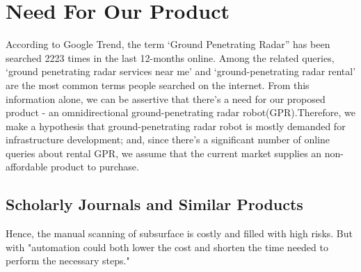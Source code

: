 \section{Need For Our Product}
According to Google Trend, the term ‘Ground Penetrating Radar” has been searched 2223 times in the last 12-months online. Among the related queries, ‘ground penetrating radar services near me’ and ‘ground-penetrating radar rental’ are the most common terms people searched on the internet. From this information alone, we can be assertive that there’s a need for our proposed product - an omnidirectional ground-penetrating radar robot(GPR).Therefore, we make a hypothesis that ground-penetrating radar robot is mostly demanded for infrastructure development; and, since there’s a significant number of online queries about rental GPR, we assume that the current market supplies an non-affordable product to purchase.

\subsection{Scholarly Journals and Similar Products}
Hence, the manual scanning of subsurface is costly and filled with high risks. But with "automation could both lower the cost and shorten the time needed to perform the necessary steps."
